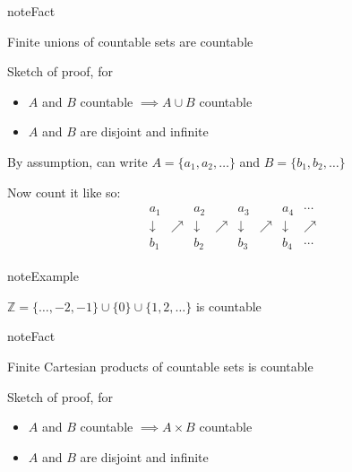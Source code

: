 \documentclass[letterpaper,10pt,english]{jupyterBook}
\begin{document}
\begin{sphinxadmonition}{note}{Fact}

\sphinxAtStartPar
Finite unions of countable sets are countable
\end{sphinxadmonition}

\sphinxAtStartPar
Sketch of proof, for
\begin{itemize}
\item {} 
\sphinxAtStartPar
\(A\) and \(B\) countable \(\implies A \cup B\) countable

\item {} 
\sphinxAtStartPar
\(A\) and \(B\) are disjoint and infinite

\end{itemize}

\sphinxAtStartPar
By assumption, can write \(A = \{a_1, a_2, \ldots\}\) and \(B = \{b_1, b_2,
\ldots\}\)

\sphinxAtStartPar
Now count it like so:
\begin{equation*}
\begin{split}
\begin{matrix}
a_1 &      & a_2 &      & a_3 &      & a_4 & \cdots\\
\downarrow & \nearrow & \downarrow & \nearrow & \downarrow & \nearrow & \downarrow & \nearrow \\
b_1 &      & b_2 &      & b_3 &      & b_4 & \cdots  
\end{matrix}
\end{split}
\end{equation*}
\begin{sphinxadmonition}{note}{Example}

\sphinxAtStartPar
\(\mathbb{Z} = \{\ldots, -2, -1\} \cup \{ 0 \} \cup \{1, 2, \ldots\}\) is countable
\end{sphinxadmonition}

\begin{sphinxadmonition}{note}{Fact}

\sphinxAtStartPar
Finite Cartesian products of countable sets is countable
\end{sphinxadmonition}

\sphinxAtStartPar
Sketch of proof, for
\begin{itemize}
\item {} 
\sphinxAtStartPar
\(A\) and \(B\) countable \(\implies A \times B\) countable

\item {} 
\sphinxAtStartPar
\(A\) and \(B\) are disjoint and infinite

\end{itemize}
\end{document}
